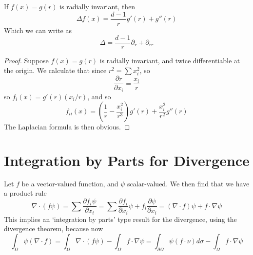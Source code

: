 \begin{theorem}
    If $f(x) = g(r)$ is radially invariant, then
    \[ \Delta f(x) = \frac{d - 1}{r} g'(r) + g''(r) \]
    Which we can write as
    \[ \Delta = \frac{d-1}{r} \partial_r + \partial_{rr} \]
\end{theorem}
\begin{proof}
Suppose $f(x) = g(r)$ is radially invariant, and twice differentiable at the origin. We calculate that since $r^2 = \sum x_i^2$, so
%
\[ \frac{\partial r}{\partial x_i} = \frac{x_i}{r} \]
%
so $f_i(x) = g'(r) (x_i/r)$, and so
%
\[ f_{ii}(x) = \left( \frac{1}{r} - \frac{x_i^2}{r^3} \right) g'(r) + \frac{x_i^2}{r^2} g''(r) \]
%
The Laplacian formula is then obvious.
\end{proof}

\section{Integration by Parts for Divergence}

Let $f$ be a vector-valued function, and $\psi$ scalar-valued. We then find that we have a product rule
%
\[ \nabla \cdot (f \psi) = \sum \frac{\partial f_i \psi}{\partial x_i} = \sum \frac{\partial f_i}{\partial x_i} \psi + f_i \frac{\partial \psi}{\partial x_i} = (\nabla \cdot f) \psi + f \cdot \nabla \psi \]
%
This implies an `integration by parts' type result for the divergence, using the divergence theorem, because now
%
\[ \int_\Omega \psi (\nabla \cdot f) = \int_\Omega \nabla \cdot (f \psi) - \int_\Omega f \cdot \nabla \psi = \int_{\partial \Omega} \psi(f \cdot \nu) d\sigma - \int_\Omega f \cdot \nabla \psi \]

